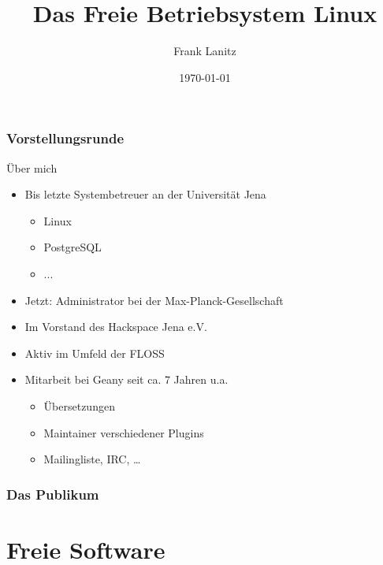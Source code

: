 \documentclass[compress]{beamer}
\title{Das Freie Betriebsystem Linux}
\author{Frank Lanitz}
\date{\today}
\begin{document}
\frame{\titlepage}
\begin{frame}
	\tableofcontents{}
\end{frame}

\begin{frame}
	\frametitle{Vorstellungsrunde}
	\begin{block}{Über mich}
		\begin{itemize}
			\item Bis letzte Systembetreuer an der Universität Jena 
				\begin{itemize}
					\item Linux
					\item PostgreSQL
					\item ...
				\end{itemize}
			\item Jetzt: Administrator bei der Max-Planck-Gesellschaft
			\item Im Vorstand des Hackspace Jena e.V.
			\item Aktiv im Umfeld der FLOSS
			\item Mitarbeit bei Geany seit ca. 7 Jahren u.a. 
			\begin{itemize}
				\item Übersetzungen
				\item Maintainer verschiedener Plugins
				\item Mailingliste, IRC, \dots
			\end{itemize}
		\end{itemize}
	\end{block}
\end{frame}
\begin{frame}
	\frametitle{Das Publikum}
\end{frame}

\section{Freie Software}
\end{document}
